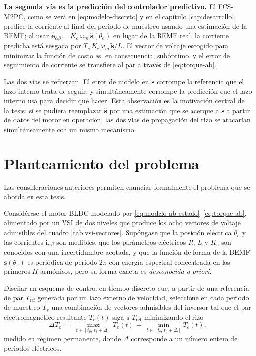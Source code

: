 \documentclass[../../../Tesis_JALS_Maestria.tex]{subfiles}
\begin{document}
\textbf{La segunda vía es la predicción del controlador predictivo.} El FCS-M2PC, como se verá en \eqref{eq:modelo-discreto} y en el capítulo \ref{cap:desarrollo}, predice la corriente al final del periodo de muestreo usando una estimación de la BEMF; al usar $\hat{\mathbf{e}}_{\alpha\beta} = K_e\,\omega_m\,\hat{\mathbf{s}}(\theta_e)$ en lugar de la BEMF real, la corriente predicha está sesgada por $T_s\,K_e\,\omega_m\,\tilde{\mathbf{s}}/L$. El vector de voltaje escogido para minimizar la función de costo es, en consecuencia, subóptimo, y el error de seguimiento de corriente se transfiere al par a través de \eqref{eq:torque-ab}.

Las dos vías se refuerzan. El error de modelo en $\mathbf{s}$ corrompe la referencia que el lazo interno trata de seguir, y simultáneamente corrompe la predicción que el lazo interno usa para decidir qué hacer. Esta observación es la motivación central de la tesis: si se pudiera reemplazar $\hat{\mathbf{s}}$ por una estimación que se acerque a $\mathbf{s}$ a partir de datos del motor en operación, las dos vías de propagación del rizo se atacarían simultáneamente con un mismo mecanismo.

\section{Planteamiento del problema}
\label{sec:problema}

Las consideraciones anteriores permiten enunciar formalmente el problema que se aborda en esta tesis.

\begin{problema}
\label{prob:principal}
Considérese el motor BLDC modelado por \eqref{eq:modelo-ab-estado}--\eqref{eq:torque-ab}, alimentado por un VSI de dos niveles que produce los ocho vectores de voltaje admisibles del cuadro \ref{tab:vsi-vectores}. Supóngase que la posición eléctrica $\theta_e$ y las corrientes $\mathbf{i}_{\alpha\beta}$ son medibles, que los parámetros eléctricos $R$, $L$ y $K_e$ son conocidos con una incertidumbre acotada, y que la función de forma de la BEMF $\mathbf{s}(\theta_e)$ es periódica de periodo $2\pi$ con energía espectral concentrada en los primeros $H$ armónicos, pero su forma exacta es \emph{desconocida a priori}.

Diseñar un esquema de control en tiempo discreto que, a partir de una referencia de par $T_\mathrm{ref}$ generada por un lazo externo de velocidad, seleccione en cada periodo de muestreo $T_s$ una combinación de vectores admisibles del inversor tal que el par electromagnético resultante $T_e(t)$ siga a $T_\mathrm{ref}$ minimizando el rizo
\[
    \Delta T_e \;=\; \max_{t \in [t_0,\,t_0+\Delta]} T_e(t)\,-\,\min_{t \in [t_0,\,t_0+\Delta]} T_e(t),
\]
medido en régimen permanente, donde $\Delta$ corresponde a un número entero de periodos eléctricos.
\end{problema}
\end{document}
